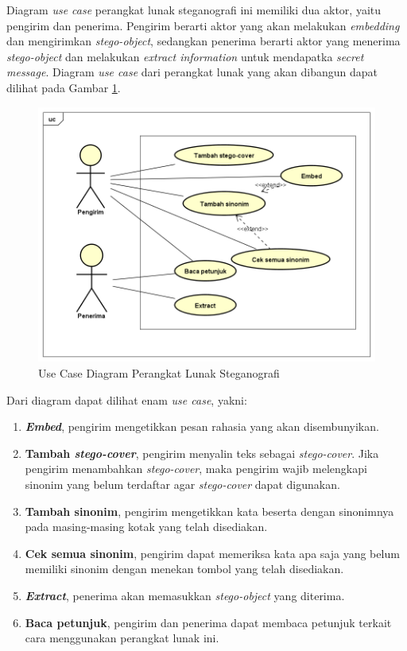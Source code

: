 Diagram \textit{use case} perangkat lunak steganografi ini memiliki dua aktor, yaitu pengirim dan penerima. Pengirim berarti aktor yang akan melakukan \textit{embedding} dan mengirimkan \textit{stego-object}, sedangkan penerima berarti aktor yang menerima \textit{stego-object} dan melakukan \textit{extract information} untuk mendapatka \textit{secret message}. Diagram \textit{use case} dari perangkat lunak yang akan dibangun dapat dilihat pada Gambar \ref{fig:3_usecase}.

\begin{figure}[H]
	\centering
	\includegraphics[scale=0.5]{Gambar/usecase}
	\caption{Use Case Diagram Perangkat Lunak Steganografi} 
	\label{fig:3_usecase}
\end{figure}

Dari diagram dapat dilihat enam \textit{use case}, yakni:
\begin{enumerate}
	\item \textbf{\textit{Embed}}, pengirim mengetikkan pesan rahasia yang akan disembunyikan.
	\item \textbf{Tambah \textit{stego-cover}}, pengirim menyalin teks sebagai \textit{stego-cover}. Jika pengirim menambahkan \textit{stego-cover}, maka pengirim wajib melengkapi sinonim yang belum terdaftar agar \textit{stego-cover} dapat digunakan.
	\item \textbf{Tambah sinonim}, pengirim mengetikkan kata beserta dengan sinonimnya pada masing-masing kotak yang telah disediakan.
	\item \textbf{Cek semua sinonim}, pengirim dapat memeriksa kata apa saja yang belum memiliki sinonim dengan menekan tombol yang telah disediakan.
	\item \textbf{\textit{Extract}}, penerima akan memasukkan \textit{stego-object} yang diterima.
	\item \textbf{Baca petunjuk}, pengirim dan penerima dapat membaca petunjuk terkait cara menggunakan perangkat lunak ini.
\end{enumerate}

